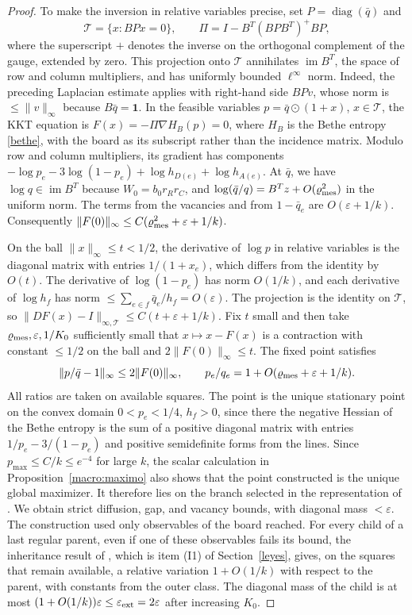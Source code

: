 \begin{proof}
To make the inversion in relative variables precise, set $P=\operatorname{diag}(\bar q)$ and
\[
 \mathcal T=\{x:BPx=0\},\qquad
 \Pi=I-B^T(BPB^T)^+BP ,
\]
where the superscript $+$ denotes the inverse on the orthogonal complement of the gauge, extended by zero.
This projection onto $\mathcal T$ annihilates $\operatorname{im}B^T$, the space of row and column
multipliers, and has uniformly bounded $\ell^\infty$ norm. Indeed, the preceding Laplacian estimate
applies with right-hand side $BPv$, whose norm is $\le\|v\|_\infty$ because $B\bar q=\mathbf1$. In
the feasible variables ${p=\bar q\odot(1+x)}$, $x\in\mathcal T$, the KKT equation is
$F(x)=-\Pi\nabla H_B(p)=0$, where $H_B$ is the Bethe entropy \eqref{bethe}, with the board as its
subscript rather than the incidence matrix.
Modulo row and column multipliers, its gradient has components $-\log p_e-3\log(1-p_e)+\log h_{D(e)}+\log
h_{A(e)}$. At $\bar q$, we have $\log q\in\operatorname{im}B^T$ because $W_0=b_0 r_Rr_C$, and $\log(\bar
q/q)=B^Tz+O(\varrho_{\rm mes}^2)$ in the uniform norm. The terms from the vacancies and from $1-\bar q_e$
are $O(\varepsilon+1/k)$. Consequently $\|F(0)\|_\infty\le C(\varrho_{\rm mes}^2+\varepsilon+1/k)$.

On the ball $\|x\|_\infty\le t<1/2$, the derivative of $\log p$ in relative variables is the diagonal
matrix with entries $1/(1+x_e)$, which differs from the identity by $O(t)$. The derivative of
$\log(1-p_e)$ has norm $O(1/k)$, and each derivative of $\log h_f$ has norm $\le\sum_{e\in f}\bar
q_e/h_f=O(\varepsilon)$. The projection is the identity on $\mathcal T$, so $\|DF(x)-I\|_{\infty,\mathcal
T}\le C(t+\varepsilon+1/k)$. Fix $t$ small and then take $\varrho_{\rm mes},\varepsilon,1/K_0$
sufficiently small that $x\mapsto x-F(x)$ is a contraction with constant $\le1/2$ on the ball and
$2\|F(0)\|_\infty\le t$. The fixed point satisfies
\[
 \|p/\bar q-1\|_\infty\le 2\|F(0)\|_\infty,\qquad
 p_e/q_e=1+O(\varrho_{\rm mes}+\varepsilon+1/k).
\]
All ratios are taken on available squares. The point is the unique stationary point on the convex domain
$0<p_e<1/4$, $h_f>0$, since there the negative Hessian of the Bethe entropy is the sum of a positive
diagonal matrix with entries $1/p_e-3/(1-p_e)$ and positive semidefinite forms from the lines. Since
$p_{\max}\le C/k\le e^{-4}$ for large $k$, the scalar calculation in Proposition~\ref{macro:maximo} also
shows that the point constructed is the unique global maximizer. It therefore lies on the branch selected
in the representation of \cite[Theorem~8.1 and the paragraph following it]{pred}. We obtain strict
diffusion, gap, and vacancy bounds, with diagonal mass $<\varepsilon$. The construction used only
observables of the board reached. For every child of a last regular parent, even if one of these
observables fails its bound, the inheritance result of \cite[Sections~6.5 and~8.2--8.3]{pred}, which
is item (I1) of Section~\ref{leyes}, gives, on the squares that remain available, a relative variation
$1+O(1/k)$ with respect to the parent, with constants from the outer class. The diagonal mass of the
child is at most $(1+O(1/k))\varepsilon\le\varepsilon_{\rm ext}=2\varepsilon$ after increasing $K_0$.
\end{proof}
